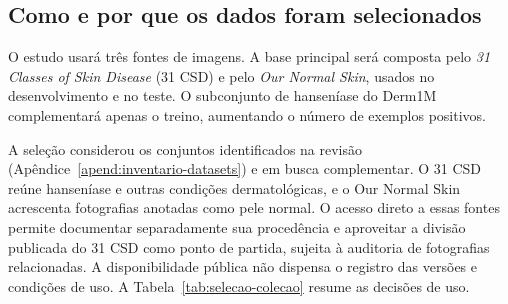 \subsection{Como e por que os dados foram selecionados}
\label{subsec:justificativa-colecao}

O estudo usará três fontes de imagens. A base principal será composta pelo
\textit{31 Classes of Skin Disease} (31 CSD) e pelo \textit{Our Normal Skin},
usados no desenvolvimento e no teste. O subconjunto de hanseníase do
Derm1M complementará apenas o treino, aumentando o número de exemplos
positivos.

A seleção considerou os conjuntos identificados na revisão
(Apêndice~\ref{apend:inventario-datasets}) e em busca complementar. O 31 CSD
reúne hanseníase e outras condições dermatológicas, e o Our Normal Skin
acrescenta fotografias anotadas como pele normal. O acesso direto a essas
fontes permite documentar separadamente sua procedência e aproveitar a
divisão publicada do 31 CSD como ponto de partida, sujeita à auditoria de
fotografias relacionadas. A disponibilidade pública não dispensa o registro
das versões e condições de uso. A Tabela~\ref{tab:selecao-colecao} resume as
decisões de uso.

